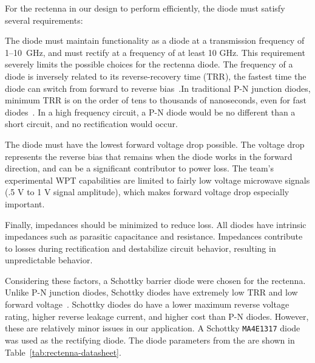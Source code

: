 For the rectenna in our design to perform efficiently, the diode must satisfy several requirements:

The diode must maintain functionality as a diode at a transmission frequency of \numrange{1}{10}~GHz, and must rectify at a frequency of at least 10 GHz. This requirement severely limits the possible choices for the rectenna diode. The frequency of a diode is inversely related to its reverse-recovery time (TRR), the fastest time the diode can switch from forward to reverse bias~\cite{an1012-TRR}.In traditional P-N junction diodes, minimum TRR is on the order of tens to thousands of nanoseconds, even for fast diodes~\cite{davis2011schottky}. In a high frequency circuit, a P-N diode would be no different than a short circuit, and no rectification would occur.

The diode must have the lowest forward voltage drop possible. The voltage drop represents the reverse bias that remains when the diode works in the forward direction, and can be a significant contributor to power loss. The team's experimental WPT capabilities are limited to fairly low voltage microwave signals (.5 V to 1 V signal amplitude), which makes forward voltage drop especially important.

Finally, impedances should be minimized to reduce loss. All diodes have intrinsic impedances such as parasitic capacitance and resistance. Impedances contribute to losses during rectification and destabilize circuit behavior, resulting in unpredictable behavior.

Considering these factors, a Schottky barrier diode were chosen for the rectenna. Unlike P-N junction diodes, Schottky diodes have extremely low TRR and low forward voltage~\cite{davis2011schottky}.  Schottky diodes do have a lower maximum reverse voltage rating, higher reverse leakage current, and higher cost than P-N diodes. However, these are relatively minor issues in our application. A Schottky \texttt{MA4E1317} diode was used as the rectifying diode. The diode parameters from the are shown in Table~\ref{tab:rectenna-datasheet}.


